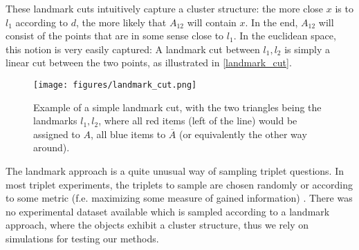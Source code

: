These landmark cuts intuitively capture a cluster structure: the more close $x$ is to $l_1$ according to $d$, the more likely that $A_{12}$ will contain $x$. In the end, $A_{12}$ will
consist of the points that are in some sense close to $l_1$. In the euclidean space, this notion is very easily captured: A landmark cut between $l_1, l_2$ is
simply a linear cut between the two points, as illustrated in \autoref{landmark_cut}.

    \begin{figure}[h]
        \centering
        \texttt{[image: figures/landmark\_cut.png]}
        \caption{Example of a simple landmark cut, with the two triangles being the landmarks $l_1, l_2$, where all red items (left of the line) 
        would be assigned to $A$, all blue items to $\overline{A}$ (or equivalently the other way around).}
        \label{fig:landmark_cut}
    \end{figure}

The landmark approach is a quite unusual way of sampling triplet questions.
In most triplet experiments, the triplets to sample are chosen randomly \cite{kleindessnerLensDepthFunction2016, haghiriEstimationPerceptualScales2019} 
or according to some metric (f.e. maximizing some measure of gained information) \cite{roadsEnrichingImageNetHuman2020}. 
There was no experimental dataset available which is sampled according to a landmark approach, where the objects exhibit a cluster structure, thus we rely on simulations
for testing our methods.

